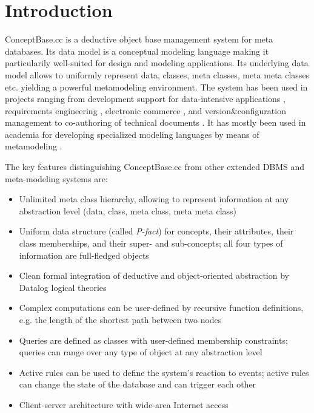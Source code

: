 

\chapter{Introduction}
\label{cha:Introduction}

ConceptBase.cc is a deductive object base management system for meta databases.
Its data model is a conceptual modeling language making it particularily
well-suited for design and modeling applications. Its underlying data model
allows to uniformly represent data, classes, meta classes, meta meta classes
etc. yielding a powerful metamodeling environment.
The system has been used in
projects ranging from development support for data-intensive applications
\cite{DWQIS99}, requirements engineering \cite{rd92,EberleinDiss,USU96},
electronic commerce \cite{MEMO}, and version\&configuration
management \cite{rjg91} to co-authoring of technical documents \cite{hjek90}.
It has mostly been used in academia for developing specialized modeling
languages by means of metamodeling \cite{Emisa,jjm09,jeus09}.

The key features distinguishing ConceptBase.cc from other extended DBMS and
meta-modeling systems are:
\begin{itemize}
\item Unlimited meta class hierarchy, allowing to represent information at any
      abstraction level (data, class, meta class, meta meta class)
\item Uniform data structure (called {\em P-fact}) for concepts,
      their attributes, their class memberships, and their super- and
      sub-concepts; all four types of information are full-fledged objects
\item Clean formal integration of deductive and object-oriented abstraction by
      Datalog logical theories
\item Complex computations can be user-defined by recursive function definitions, e.g.
      the length of the shortest path between two nodes
\item Queries are defined as classes with user-defined membership constraints;
      queries can range over any type of object at any abstraction level
\item Active rules can be used to define the system's reaction to events; active
      rules can change the state of the database and can trigger each other
\item Client-server architecture with wide-area Internet access
\end{itemize}


